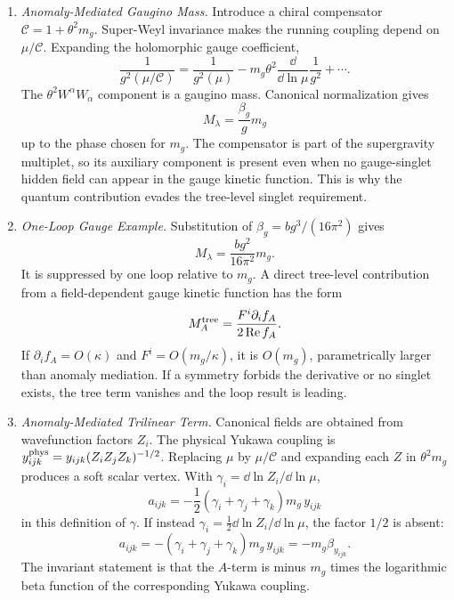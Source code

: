 \begin{enumerate}
  \begin{enumerate}
    \item \emph{Anomaly-Mediated Gaugino Mass.}
    Introduce a chiral compensator
      \(\mathcal C=1+\theta^2m_g\).  Super-Weyl invariance makes the running
      coupling depend on \(\mu/\mathcal C\).  Expanding the holomorphic
      gauge coefficient,
      \[
        \frac1{g^2(\mu/\mathcal C)}
          =\frac1{g^2(\mu)}
           -m_g\theta^2\frac{\dd}{\dd\ln\mu}\frac1{g^2}+\cdots .
      \]
      The \(\theta^2W^\alpha W_\alpha\) component is a gaugino mass.
      Canonical normalization gives
      \[
        M_\lambda=\frac{\beta_g}{g}m_g
      \]
      up to the phase chosen for \(m_g\).  The compensator is part of the
      supergravity multiplet, so its auxiliary component is present even
      when no gauge-singlet hidden field can appear in the gauge kinetic
      function.  This is why the quantum contribution evades the
      tree-level singlet requirement.
    \item \emph{One-Loop Gauge Example.}
    Substitution of
      \(\beta_g=bg^3/(16\pi^2)\) gives
      \[
        M_\lambda=\frac{bg^2}{16\pi^2}m_g.
      \]
      It is suppressed by one loop relative to \(m_g\).  A direct
      tree-level contribution from a field-dependent gauge kinetic
      function has the form
      \[
        M_A^{\rm tree}
          =\frac{F^i\partial_i f_A}{2\operatorname{Re}f_A}.
      \]
      If \(\partial_i f_A=O(\kappa)\) and \(F^i=O(m_g/\kappa)\), it is
      \(O(m_g)\), parametrically larger than anomaly mediation.  If a
      symmetry forbids the derivative or no singlet exists, the tree term
      vanishes and the loop result is leading.
    \item \emph{Anomaly-Mediated Trilinear Term.}
    Canonical fields are obtained from wavefunction factors \(Z_i\).
      The physical Yukawa coupling is
      \(y^{\rm phys}_{ijk}=y_{ijk}(Z_iZ_jZ_k)^{-1/2}\).  Replacing
      \(\mu\) by \(\mu/\mathcal C\) and expanding each \(Z\) in
      \(\theta^2m_g\) produces a soft scalar vertex.  With
      \(\gamma_i=\dd\ln Z_i/\dd\ln\mu\),
      \[
        a_{ijk}
          =-\frac12(\gamma_i+\gamma_j+\gamma_k)m_g\,y_{ijk}
      \]
      in this definition of \(\gamma\).  If instead
      \(\gamma_i=\tfrac12\dd\ln Z_i/\dd\ln\mu\), the factor \(1/2\) is absent:
      \[
        a_{ijk}=-(\gamma_i+\gamma_j+\gamma_k)m_g\,y_{ijk}
                =-m_g\beta_{y_{ijk}}.
      \]
      The invariant statement is that the \(A\)-term is minus \(m_g\) times
      the logarithmic beta function of the corresponding Yukawa coupling.
  \end{enumerate}


\end{enumerate}
